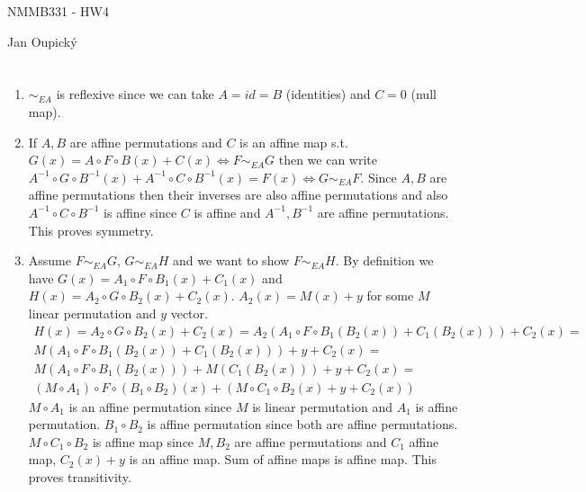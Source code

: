 \documentclass[12pt, a4paper]{article}
\begin{document}
\begin{center}
\large NMMB331 - HW4

\normalsize Jan Oupický
\end{center}
\vspace{1\baselineskip}

\section{}
\begin{enumerate}
    \item $\sim_{EA}$ is reflexive since we can take $A=id=B$ (identities) and $C = 0$ (null map).
    \item If $A,B$ are affine permutations and $C$ is an affine map s.t. $G(x)= A \circ F \circ B (x) + C(x) \iff F \sim_{EA} G$ then we can write $A^{-1}\circ G \circ B^{-1} (x) + A^{-1}\circ C \circ B^{-1} (x) = F(x) \iff G \sim_{EA} F$. Since $A,B$ are affine permutations then their inverses are also affine permutations and also $A^{-1}\circ C \circ B^{-1}$ is affine since $C$ is affine and $A^{-1},B^{-1}$ are affine permutations. This proves symmetry.
    \item Assume $F \sim_{EA} G$, $G \sim_{EA} H$ and we want to show $F \sim_{EA} H$. By definition we have $G(x)= A_1 \circ F \circ B_1 (x) + C_1(x)$ and $H(x) = A_2 \circ G \circ B_2 (x) + C_2(x)$. $A_2(x) = M(x)+y$ for some $M$ linear permutation and $y$ vector.
    \begin{gather*}
    H(x) = A_2 \circ G \circ B_2 (x) + C_2(x) = A_2 (A_1 \circ F \circ B_1 (B_2(x)) + C_1(B_2(x))) + C_2(x) =\\
    M(A_1 \circ F \circ B_1 (B_2(x)) + C_1(B_2(x))) + y + C_2(x) =\\
    M(A_1 \circ F \circ B_1 (B_2(x))) + M(C_1(B_2(x))) + y + C_2(x) = \\
    (M \circ A_1) \circ F \circ (B_1 \circ B_2)(x) + (M \circ C_1 \circ B_2(x) + y + C_2(x))
    \end{gather*}
    $M \circ A_1$ is an affine permutation since $M$ is linear permutation and $A_1$ is affine permutation. $B_1 \circ B_2$ is affine permutation since both are affine permutations. $M \circ C_1 \circ B_2$ is affine map since $M, B_2$ are affine permutations and $C_1$ affine map, $C_2(x)+y$ is an affine map. Sum of affine maps is affine map. This proves transitivity.
\end{enumerate}
\end{document}
